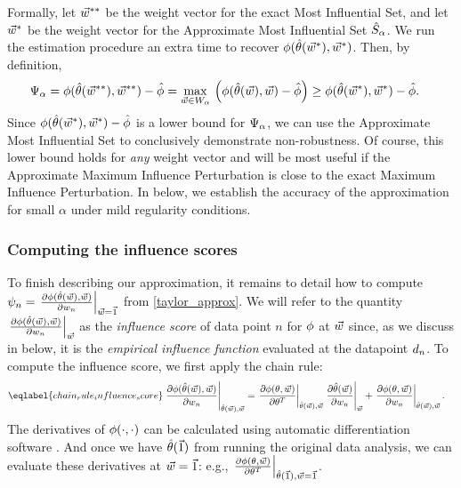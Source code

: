 Formally, let $\vec{w}^{**}$ be the weight vector for the exact Most Influential Set,
and let $\vec{w}^*$ be the weight vector for the Approximate Most Influential Set
$\hat{S}_{\alpha}$. We run the estimation procedure an extra time to recover
$\phi(\hat{\theta}(\vec{w}^{*}), \vec{w}^{*})$. Then, by definition,
%
\begin{align*}
	\Psi_{\alpha} = \phi(\hat{\theta}(\vec{w}^{**}), \vec{w}^{**}) - \hat{\phi}
		&=
                    \underset{\vec{w} \in W_\alpha}{\mathrm{max}}\,
                    \left(\phi(\hat{\theta}(\vec{w}), \vec{w}) - \hat{\phi} \right)
                    \ge
                    \phi(\hat{\theta}(\vec{w}^{*}), \vec{w}^{*}) - \hat{\phi}.
\end{align*}
%
Since $\phi(\hat{\theta}(\vec{w}^{*}), \vec{w}^{*}) - \hat{\phi}$ is a lower bound for
$\Psi_{\alpha}$, we can use the Approximate Most Influential Set to
conclusively demonstrate non-robustness. Of course, this lower bound holds for
{\em any} weight vector and will be most useful if the Approximate Maximum
Influence Perturbation is close to the exact Maximum Influence Perturbation. In
 below, we establish the accuracy of the approximation for small
$\alpha$ under mild regularity conditions.

\subsubsection{Computing the influence scores}

To finish describing our approximation, it remains to detail how to compute
$\psi_n = \left.\frac{\partial \phi(\hat{\theta}(\vec{w}), \vec{w})}{\partial
w_n}\right|_{\vec{w}=\vec{1}}$ from \eqref{taylor_approx}. We will refer to the quantity
$\left.\frac{\partial \phi(\hat{\theta}(\vec{w}), \vec{w})}{\partial w_n}\right|_{\vec{w}}$ as the
\emph{influence score} of data point $n$ for $\phi$ at $\vec{w}$ since, as we
discuss in  below, it is the \emph{empirical
influence function} evaluated at the datapoint $d_{n}$. To compute the
influence score, we first apply the chain rule:
%
\begin{align} \eqlabel{chain_rule_influence_score}
	\fracat{\partial \thetafun(\thetahat(\w), \w)}{\partial w_n}
           {\thetahat(\w), \w}
		&=  \fracat{\partial \thetafun(\theta, \w)}{\partial \theta^T}{\thetahat(\w), \w}
   			 \fracat{\partial \thetahat(\w)}{\partial w_n}{\w} +
  			\fracat{\partial \thetafun(\theta, \w)}{\partial w_n}{\thetahat(\w), \w}.
\end{align}
%
The derivatives of $\phi(\cdot,\cdot)$ can be calculated using automatic
differentiation software
\citep{baydin2018automatic,tensorflow:2015:whitepaper,jax:2018:github,pytorch:2019:lots}.
And once we have $\hat{\theta}(\vec{1})$ from running the original data analysis,
we can evaluate these derivatives at $\vec{w} = \vec{1}$: e.g., $\left.\frac{\partial
\phi(\theta, \vec{w})}{\partial \theta^T}\right|_{\hat{\theta}(\vec{1}), \vec{w}=\vec{1}}$.

